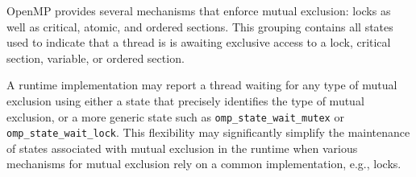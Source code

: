 
OpenMP provides several mechanisms that enforce mutual exclusion:
locks as well as critical, atomic, and ordered sections.  This
grouping contains all states used to indicate that a thread is is
awaiting exclusive access to a lock, critical section, variable,
or ordered section.

A runtime implementation may report a thread waiting for any type
of mutual exclusion using either a state that precisely identifies
the type of mutual exclusion, or  a more generic state such as
\verb|omp_state_wait_mutex| or \verb|omp_state_wait_lock|.  This
flexibility may significantly simplify the maintenance of states
associated with mutual exclusion in the runtime when various
mechanisms for mutual exclusion rely on a common implementation,
e.g., locks.



